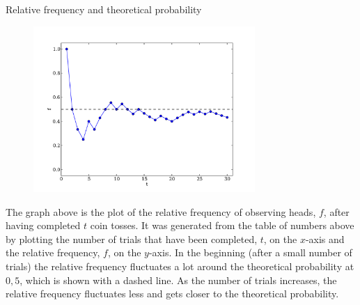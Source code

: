 \begin{wex}{Relative frequency and theoretical probability}
{\begin{figure}[H]
  \begin{center}
    \includegraphics[width=0.75\textwidth]{Gr10-Probability-images/coin_toss_trials.pdf}
  \end{center}
\end{figure}

\noindent The graph above is the plot of the relative frequency of observing heads, $f$,
after having completed $t$ coin tosses. It was generated from the table of numbers above
by plotting the number of trials that have been completed, $t$, on the
$x$-axis and the relative frequency, $f$, on the $y$-axis. In the
beginning (after a small number of trials) the relative frequency
fluctuates a lot around the theoretical probability at $0,5$, which is
shown with a dashed line. As the number of trials increases, the
relative frequency fluctuates less and gets closer to the theoretical
probability. 
}
\end{wex}


